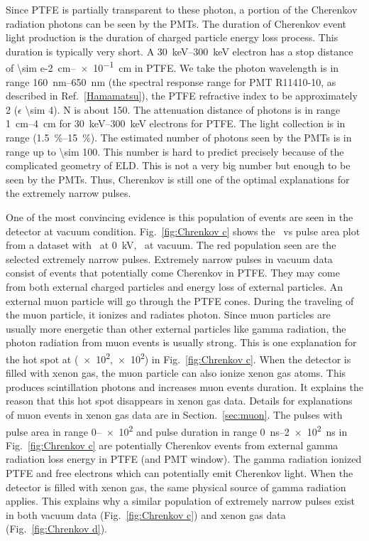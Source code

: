 Since PTFE is partially transparent to these photon, a portion of the Cherenkov radiation photons can be seen by the PMTs. The duration of Cherenkov event light production is the duration of charged particle energy loss process. This duration is typically very short. A \SIrange{30}{300}{\keV} electron has a stop distance of \SIrange{\sim e-2}{e-1}{cm} in PTFE. We take the photon wavelength is in range \SIrange{160}{650}{\nm} (the spectral response range for PMT R11410-10, as described in Ref.~\ref{Hamamatsu}), the PTFE refractive index to be approximately 2 ($\epsilon$ \num{\sim 4}). N is about \num{150}. The attenuation distance of photons is in range \SIrange{1}{4}{\cm} for \SIrange{30}{300}{\keV} electrons for PTFE. 
The light collection is in range (\SIrange{1.5}{15}{\percent}). 
The estimated number of photons seen by the PMTs is in range up to \SI{\sim 100}{\phe}. 
This number is hard to predict precisely because of the complicated geometry of ELD. This is not a very big number but enough to be seen by the PMTs. 
Thus, Cherenkov is still one of the optimal explanations for the extremely narrow pulses.

One of the most convincing evidence is this population of events are seen in the detector at vacuum condition. Fig.~\ref{fig:Chrenkov c} shows the \pud\ vs pulse area plot from a dataset with \opvtvb\ at \SI{0}{\kV}, \opgd\ at vacuum. The red population seen are the selected extremely narrow pulses. Extremely narrow pulses in vacuum data consist of events that potentially come Cherenkov in PTFE.  They may come from both external charged particles and energy loss of external particles. An external muon particle will go through the PTFE cones. During the traveling of the muon particle, it ionizes and radiates photon. Since muon particles are usually more energetic than other external particles like gamma radiation, the photon radiation from muon events is usually strong. This is one explanation for the hot spot at (\num{e2},\num{e2}) in Fig.~\ref{fig:Chrenkov c}. When the detector is filled with xenon gas, the muon particle can also ionize xenon gas atoms. This produces scintillation photons and increases muon events duration. It explains the reason that this hot spot disappears in xenon gas data. Details for explanations of muon events in xenon gas data are in Section.~\ref{sec:muon}. The pulses with pulse area in range \SIrange{0}{e2}{\phe} and pulse duration in range \SIrange{0}{2e2}{\ns} in Fig.~\ref{fig:Chrenkov c} are potentially Cherenkov events from external gamma radiation loss energy in PTFE (and PMT window). The gamma radiation ionized PTFE and free electrons which can potentially emit Cherenkov light.
When the detector is filled with xenon gas, the same physical source of gamma radiation applies. This explains why a similar population of extremely narrow pulses exist in both vacuum data (Fig.~\ref{fig:Chrenkov c}) and xenon gas data  (Fig.~\ref{fig:Chrenkov d}).

